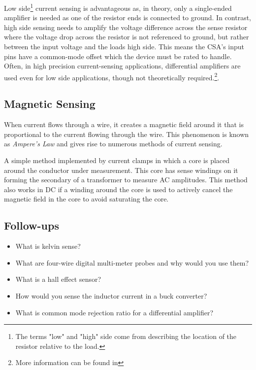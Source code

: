 \documentclass[main.tex]{subfiles}
\begin{document}
\noindent Low side\footnote{The terms "low" and "high" side come from describing the location of the resistor relative to the load.} current sensing is advantageous as, in theory, only a single-ended amplifier is needed as one of the resistor ends is connected to ground. In contrast, high side sensing needs to amplify the voltage difference across the sense resistor where the voltage drop across the resistor is not referenced to ground, but rather between the input voltage and the loads high side. This means the CSA's input pins have a common-mode offset which the device must be rated to handle. Often, in high precision current-sensing applications, differential amplifiers are used even for low side applications, though not theoretically required.\footnote{More information can be found in }. 

\subsection{Magnetic Sensing}
When current flows through a wire, it creates a magnetic field around it that is proportional to the current flowing through the wire. This phenomenon is known as \textit{Ampere's Law} and gives rise to numerous methods of current sensing. \newline

\newnoindentpara A simple method implemented by current clamps in which a core is placed around the conductor under measurement. This core has sense windings on it forming the secondary of a transformer to measure AC amplitudes. This method also works in DC if a winding around the core is used to actively cancel the magnetic field in the core to avoid saturating the core.  

\subsection{Follow-ups}
\begin{itemize}
    \item What is kelvin sense? 
    \item What are four-wire digital multi-meter probes and why would you use them?
    \item What is a hall effect sensor?
    \item How would you sense the inductor current in a buck converter?
    \item What is common mode rejection ratio for a differential amplifier?
\end{itemize}
\end{document}
